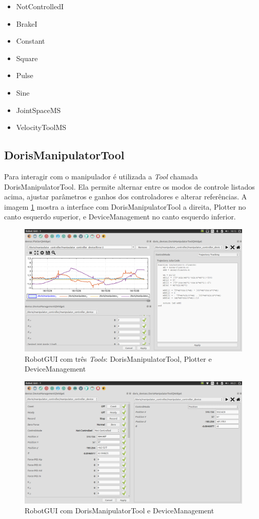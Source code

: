 \begin{itemize}
	\item NotControlledI
	\item BrakeI
	\item Constant
	\item Square
	\item Pulse
	\item Sine
	\item JointSpaceMS
	\item VelocityToolMS
\end{itemize}

\subsection{DorisManipulatorTool}
Para interagir com o manipulador é utilizada a \textit{Tool} chamada DorisManipulatorTool. Ela permite alternar entre os modos de controle listados acima, ajustar parâmetros e ganhos dos controladores e alterar referências. A imagem \ref{fig:screenshot1} mostra a interface com DorisManipulatorTool a direita,  Plotter no canto esquerdo superior, e DeviceManagement no canto esquerdo inferior.
 
\begin{figure}[!h]
  \centering
  \includegraphics[width=\linewidth]{./img/screenshot/sc1.png}
  \caption{RobotGUI com três \textit{Tools}: DorisManipulatorTool, Plotter e DeviceManagement}
  \label{fig:screenshot1}
\end{figure}


\begin{figure}[!h]
  \centering
  \includegraphics[width=\linewidth]{./img/screenshot/sc2.png}
  \caption{RobotGUI com DorisManipulatorTool e DeviceManagement}
  \label{fig:screenshot2}
\end{figure}

